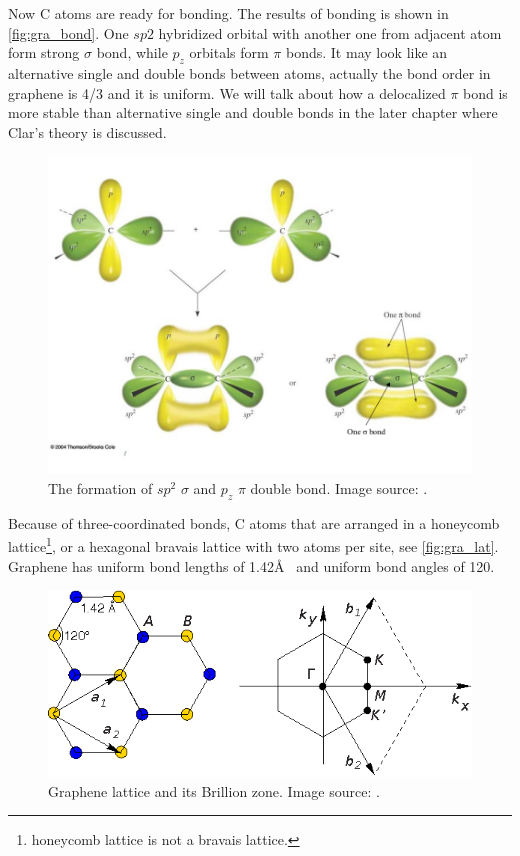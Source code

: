 Now C atoms are ready for bonding. The results of bonding is shown in \autoref{fig:gra_bond}. One $sp2$ hybridized orbital with another one from adjacent atom form strong $\sigma$ bond, while $p_z$ orbitals form $\pi$ bonds. It may look like an alternative single and double bonds between atoms, actually the bond order in graphene is 4/3 and it is uniform. We will talk about how a delocalized $\pi$ bond is more stable than alternative single and double bonds in the later chapter where Clar's theory is discussed.

\begin{figure}[htbp!] 
\centering  
\includegraphics[width=\textwidth]{double_bond}
\caption{The formation of $sp^2$ $\sigma$ and $p_z$ $\pi$ double bond. Image source: \cite{gra_bond}. }  
\label{fig:gra_bond}
\end{figure} 

Because of three-coordinated bonds, C atoms that are arranged in a honeycomb lattice\footnote{honeycomb lattice is not a bravais lattice.}, or a hexagonal bravais lattice with two atoms per site, see \autoref{fig:gra_lat}. Graphene has uniform bond lengths of 1.42\AA~ and uniform bond angles of 120\textdegree.

\begin{figure}[htbp!] 
\centering  
\includegraphics[width=\textwidth]{gra_lat.eps}
\caption{Graphene lattice and its Brillion zone. Image source: \cite{CastroNeto2009}. }  
\label{fig:gra_lat}
\end{figure} 

